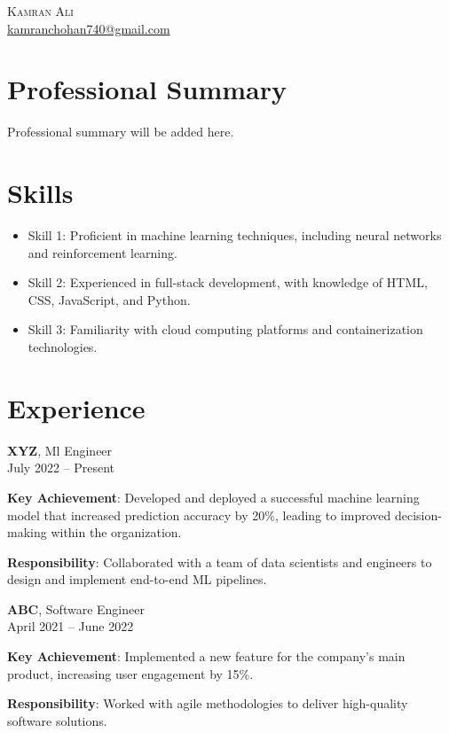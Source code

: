 \documentclass{article}
\newcommand{\resumeItem}[2]{
  \item\textbf{#1}{: #2 \vspace{-2pt}}
}
\begin{document}
\begin{center}
    {\Huge \scshape Kamran Ali} \\ \vspace{1pt}
    \href{mailto:kamranchohan740@gmail.com}{kamranchohan740@gmail.com}
\end{center}

\section*{Professional Summary}
Professional summary will be added here.

\section*{Skills}
\begin{itemize}[leftmargin=*]
    \item Skill 1: Proficient in machine learning techniques, including neural networks and reinforcement learning.
    \item Skill 2: Experienced in full-stack development, with knowledge of HTML, CSS, JavaScript, and Python.
    \item Skill 3: Familiarity with cloud computing platforms and containerization technologies.
\end{itemize}

\section*{Experience}
\begin{itemize}[leftmargin=*]
    \item[]
    {
        \textbf{XYZ}{, Ml Engineer} \\
        {July 2022 -- Present} \\
        \resumeItem{Key Achievement}
        {Developed and deployed a successful machine learning model that increased prediction accuracy by 20\%, leading to improved decision-making within the organization.}
        \resumeItem{Responsibility}
        {Collaborated with a team of data scientists and engineers to design and implement end-to-end ML pipelines.}
    }
    \item[]
    {
        \textbf{ABC}{, Software Engineer} \\
        {April 2021 -- June 2022} \\
        \resumeItem{Key Achievement}
        {Implemented a new feature for the company's main product, increasing user engagement by 15\%.}
        \resumeItem{Responsibility}
        {Worked with agile methodologies to deliver high-quality software solutions.}
    }
\end{itemize}
\end{document}
